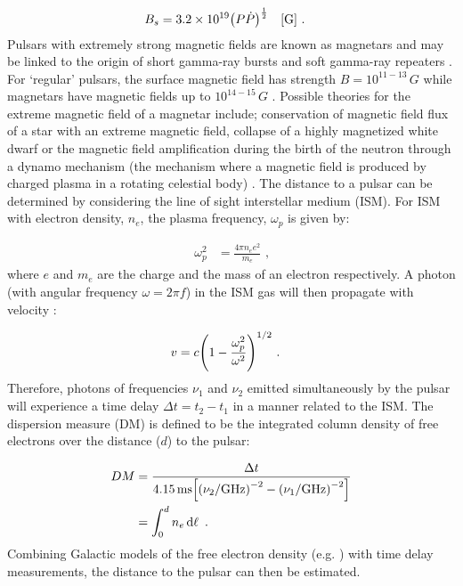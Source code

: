 \begin{equation}
    \begin{aligned}
    B_s&=3.2\times 10^{19}\qty(P\dot{P})^\half\quad\qty[\si{G}]\text{ .}
    \end{aligned}
\end{equation}
\noindent Pulsars with extremely strong magnetic fields are known as magnetars and may be linked to the origin of short gamma-ray bursts and soft gamma-ray repeaters \citep{1992ApJ...392L...9D}. For `regular' pulsars, the surface magnetic field has strength $B=10^{11-13}\,\si{G}$ while magnetars have magnetic fields up to $10^{14-15}\,\si{G}$ \citep{2007ASSL..326.....H}. Possible theories for the extreme magnetic field of a magnetar include; conservation of magnetic field flux of a star with an extreme magnetic field, collapse of a highly magnetized white dwarf or the magnetic field amplification during the birth of the neutron through a dynamo mechanism (the mechanism where a magnetic field is produced by charged plasma in a rotating celestial body) \citep{1992ApJ...392L...9D, 1993_magnetar, 1996AIPC..366..111D}.
\newpar
The distance to a pulsar can be determined by considering the line of sight interstellar medium (ISM). For ISM with electron density, $n_e$, the plasma frequency, $\omega_p$ is given by:

\begin{equation}
    \begin{aligned}
        \omega_p^2&=\frac{4\pi n_ee^2}{m_e}\text{ ,}
    \end{aligned}
\end{equation}
\noindent where $e$ and $m_e$ are the charge and the mass of an electron respectively. A photon (with angular frequency $\omega=2\pi f$) in the ISM gas will then propagate with velocity \citep{2011piim.book.....D}:

\begin{equation}
    \begin{aligned}
        v&=c\qty(1-\frac{\omega_p^2}{\omega^2})^{1/2}\text{ .}
    \end{aligned}
\end{equation}
\noindent Therefore, photons of frequencies $\nu_1$ and $\nu_2$ emitted simultaneously by the pulsar will experience a time delay $\Delta t= t_2-t_1$ in a manner related to the ISM. The dispersion measure (DM) is defined to be the integrated column density of free electrons over the distance ($d$) to the pulsar\citep{2011piim.book.....D}:

\begin{equation}
    \begin{aligned}
        DM&= \frac{\Delta t}{4.15\,\si{\milli\second}\qty[\qty(\nu_2/\si{\giga\hertz})^{-2}-\qty(\nu_1/\si{\giga\hertz})^{-2}]}\\
        &= \int_0^dn_e \dd{\ell}\text{ .}
    \end{aligned} \label{eq:chapter_1_dispersion_measurement}
\end{equation}
\noindent Combining Galactic models of the free electron density (e.g. \cite{2017ApJ...835...29Y}) with time delay measurements, the distance to the pulsar can then be estimated.
 
